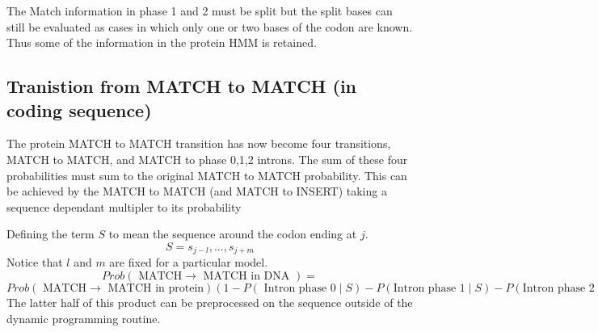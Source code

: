 The Match information in phase 1 and 2 must be split but the split bases can still be evaluated
as cases in which only one or two bases of the codon are known. Thus some of the
information in the protein HMM is retained.



\subsection{Tranistion from MATCH to MATCH (in coding sequence)}


The protein MATCH to MATCH transition has now become four transitions, MATCH to MATCH, and MATCH to phase 0,1,2 introns.
The sum of these four probabilities must sum to the original MATCH to MATCH probability. This can
be achieved by the MATCH to MATCH (and MATCH to INSERT) taking a sequence dependant multipler to its
probability

Defining the term $S$ to mean the sequence around the codon ending at $j$.
$$
S = s_{j-l},...,s_{j+m}
$$
Notice that $l$ and $m$ are fixed for a particular model. 
$$
Prob(\mbox{ MATCH}\rightarrow \mbox{ MATCH in DNA }) =
$$
$$
Prob(\mbox{ MATCH}\rightarrow \mbox{ MATCH in protein})
(1 - P(\mbox{ Intron phase 0}\;|\;S) - P(\mbox{Intron phase 1}\;|\;S) - P(\mbox{Intron phase 2}\;|\;S))
$$
The latter half of this product can be preprocessed on the sequence outside of the dynamic programming routine.



























